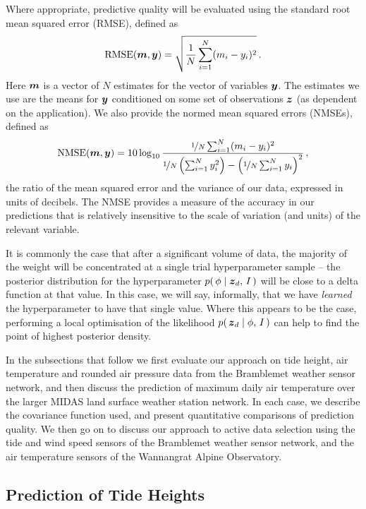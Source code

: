 \documentclass{acmtrans2m}
\begin{document}
Where appropriate, predictive quality will be evaluated using the standard root mean squared error (RMSE), defined as
\begin{equation*}
 \text{RMSE}(\boldsymbol{m},\boldsymbol{y}) = \sqrt{\frac{1}{N}\sum_{i=1}^N (m_i-y_i)^2}\,.
\end{equation*}
Here $\boldsymbol{m}$ is a vector of $N$ estimates for the vector of variables $\boldsymbol{y}$. The estimates we use are the means for $\boldsymbol{y}$ conditioned on some set of observations $\boldsymbol{z}$ (as dependent on the application). We also provide the normed mean squared errors (NMSEs), defined as
\begin{equation*}%
 \text{NMSE}(\vect{m},\vy) = 10 \log_{10} \frac{\nicefrac{1}{N} \sum_{i= 1}^{N} (m_i - y_i)^2 }{\nicefrac{1}{N} \left(\sum_{i = 1}^{N} y_i^2\right) - \left(\nicefrac{1}{N} \sum_{i = 1}^{N} y_i\right)^2 }\,,
\end{equation*}
the ratio of the mean squared error and the variance of our data, expressed in units of decibels. The NMSE provides a measure of the accuracy in our predictions that is relatively insensitive to the scale of variation (and units) of the relevant variable.

It is commonly the case that after a significant volume of data, the majority of the weight will be concentrated at a single trial hyperparameter sample -- the posterior distribution for the hyperparameter $p\!\left(\,\phi\mid\boldsymbol{z}_d,\,I\,\right)$ will be close to a delta function at that value. In this case, we will say, informally, that we have \emph{learned} the hyperparameter to have that single value. Where this appears to be the case, performing a local optimisation of the likelihood $p\!\left(\,\boldsymbol{z}_d\mid\phi,\,I\,\right)$ can help to find the point of highest posterior density.

In the subsections that follow we first evaluate our approach on tide height, air temperature and rounded air pressure data from the Bramblemet weather sensor network, and then discuss the prediction of maximum daily air temperature over the larger MIDAS land surface weather station network. In each case, we describe the covariance function used, and present quantitative comparisons of prediction quality. We then go on to discuss our approach to active data selection using the tide and wind speed sensors of the Bramblemet weather sensor network, and the air temperature sensors of the Wannangrat Alpine Observatory.

\subsection{Prediction of Tide Heights} \label{sec:tide_pred}
\end{document}
